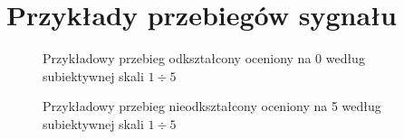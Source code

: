\chapter{Przykłady przebiegów sygnału} %

\label{app:suplementA}

\begin{figure}[htpb]
\label{fig:distorted_signal} 
\caption{Przykładowy przebieg odkształcony oceniony na 0 według subiektywnej skali $1\div5$} 
\end{figure}

\begin{figure}[htpb]
\label{fig:ideal_signal} 
\caption{Przykładowy przebieg nieodkształcony oceniony na 5 według subiektywnej skali $1\div5$} 
\end{figure}